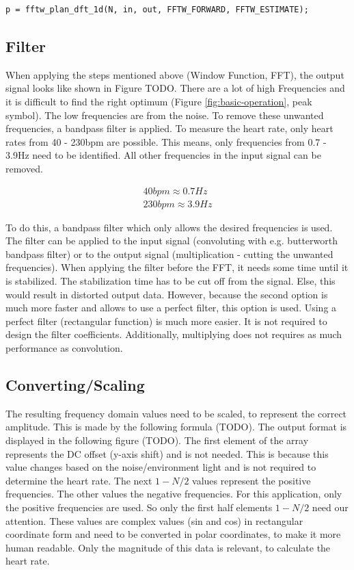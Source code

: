\documentclass[notitlepage]{scrreprt}
\begin{document}
\begin{lstlisting}
p = fftw_plan_dft_1d(N, in, out, FFTW_FORWARD, FFTW_ESTIMATE);
\end{lstlisting}

\subsection{Filter}
When applying the steps mentioned above (Window Function, FFT), the output signal looks like shown in Figure TODO. There are a lot of high Frequencies and it is difficult to find the right optimum (Figure \ref{fig:basic-operation}, peak symbol). The low frequencies are from the noise. To remove these unwanted frequencies, a bandpass filter is applied. To measure the heart rate, only heart rates from
40 - 230bpm are possible. This means, only frequencies from 0.7 - 3.9Hz need to be identified. All other frequencies in the input signal can be removed.

\begin{equation}
\begin{aligned}
40bpm \approx 0.7Hz\\
230bpm \approx 3.9Hz
\end{aligned}
\end{equation}

To do this, a bandpass filter which only allows the desired frequencies is used. The filter can be applied to the input signal (convoluting with e.g. butterworth bandpass filter) or to the output signal (multiplication - cutting the unwanted frequencies). When applying the filter before the FFT, it needs some time until it is stabilized. The stabilization time has to be cut off from the signal. Else, this would result in distorted output data. However, because the second option is much more faster and allows to use a perfect filter, this option is used. Using a perfect filter (rectangular function) is much more easier. It is not required to design the filter coefficients. Additionally, multiplying does not requires as much performance as convolution.

\subsection{Converting/Scaling}
The resulting frequency domain values need to be scaled, to represent the correct amplitude. This is made by the following formula (TODO). The output format is displayed in the following figure (TODO). The first element of the array represents the DC offset (y-axis shift) and is not needed. This is because this value changes based on the noise/environment light and is not required to determine the heart rate. The next $1 - N/2$ values represent the positive frequencies. The other values the negative frequencies. For this application, only the positive frequencies are used. So only the first half elements $1 - N/2$ need our attention. These values are complex values (sin and cos) in rectangular coordinate form and need to be converted in polar coordinates, to make it more human readable. Only the magnitude of this data is relevant, to calculate the heart rate.
\end{document}
